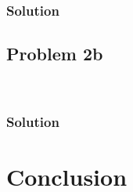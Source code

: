 \documentclass[conf]{new-aiaa}
\begin{document}

\subsubsection*{Solution} 





\subsection*{Problem 2b} 

\begin{center}
	 \\
\end{center}


\subsubsection*{Solution} 



\section*{Conclusion} 

\end{document}

